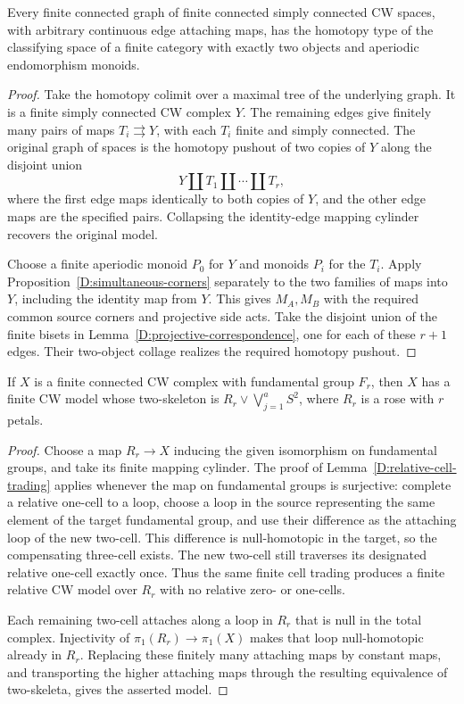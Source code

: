 \begin{theorem}
\label{D:graphs-two-objects}
Every finite connected graph of finite connected simply connected CW
spaces, with arbitrary continuous edge attaching maps, has the homotopy
type of the classifying space of a finite category with exactly two
objects and aperiodic endomorphism monoids.
\end{theorem}
\begin{proof}
Take the homotopy colimit over a maximal tree of the underlying graph.
It is a finite simply connected CW complex $Y$. The remaining edges
give finitely many pairs of maps $T_i\rightrightarrows Y$, with each
$T_i$ finite and simply connected. The original graph of spaces is the
homotopy pushout of two copies of $Y$ along the disjoint union
\[
 Y\amalg T_1\amalg\cdots\amalg T_r,
\]
where the first edge maps identically to both copies of $Y$, and the
other edge maps are the specified pairs. Collapsing the identity-edge
mapping cylinder recovers the original model.

Choose a finite aperiodic monoid $P_0$ for $Y$ and monoids $P_i$ for the
$T_i$. Apply Proposition~\ref{D:simultaneous-corners} separately to the
two families of maps into $Y$, including the identity map from $Y$.
This gives $M_A,M_B$ with the required common source corners and
projective side acts. Take the disjoint union of the finite bisets in
Lemma~\ref{D:projective-correspondence}, one for each of these $r+1$
edges. Their two-object collage realizes the required homotopy pushout.
\end{proof}

\begin{lemma}
\label{D:rose-skeleton}
If $X$ is a finite connected CW complex with fundamental group $F_r$,
then $X$ has a finite CW model whose two-skeleton is
$R_r\vee\bigvee_{j=1}^a S^2$, where $R_r$ is a rose with $r$ petals.
\end{lemma}
\begin{proof}
Choose a map $R_r\to X$ inducing the given isomorphism on fundamental
groups, and take its finite mapping cylinder. The proof of
Lemma~\ref{D:relative-cell-trading} applies whenever the map on fundamental
groups is surjective: complete a relative one-cell to a loop, choose a
loop in the source representing the same element of the target fundamental
group, and use their difference as the attaching loop of the new two-cell.
This difference is null-homotopic in the target, so the compensating
three-cell exists. The new two-cell still traverses its designated
relative one-cell exactly once. Thus the same finite cell trading produces
a finite relative CW model over $R_r$ with no relative zero- or one-cells.

Each remaining two-cell attaches along a loop in $R_r$ that is null in
the total complex. Injectivity of $\pi_1(R_r)\to\pi_1(X)$ makes that loop
null-homotopic already in $R_r$. Replacing these finitely many attaching
maps by constant maps, and transporting the higher attaching maps through
the resulting equivalence of two-skeleta, gives the asserted model.
\end{proof}

